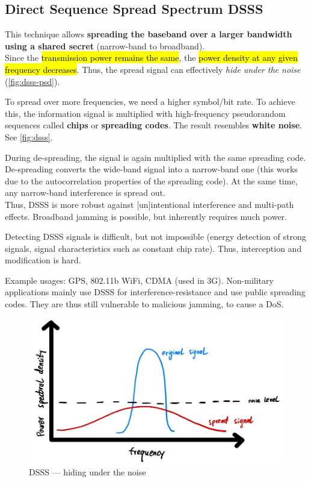 \subsection{Direct Sequence Spread Spectrum DSSS}
This technique allows  \textbf{spreading the baseband over a larger bandwidth using a shared secret} (narrow-band to broadband). \\
Since the \hl{transmission power remains the same}, the \hl{power density at any given frequency decreases}.
Thus, the spread signal can effectively \emph{hide under the noise} (\autoref{fig:dsss-psd}).

To spread over more frequencies, we need a higher symbol/bit rate. To achieve this, the information signal is multiplied with high-frequency pseudorandom sequences called \textbf{chips} or \textbf{spreading codes}.
The result resembles \textbf{white noise}.
See \autoref{fig:dsss}.

During de-spreading, the signal is again multiplied with the same spreading code.
De-spreading converts the wide-band signal into a narrow-band one (this works due to the autocorrelation properties of the spreading code).
At the same time, any narrow-band interference is spread out.
\\
Thus, DSSS is more robust against [un]intentional interference and multi-path effects. Broadband jamming is possible, but inherently requires much power.

Detecting DSSS signals is difficult, but not impossible (energy detection of strong signals, signal characteristics such as constant chip rate). Thus, interception and modification is hard.

Example usages: GPS, 802.11b WiFi, CDMA (used in 3G).
Non-military applications mainly use DSSS for interference-resistance and use public spreading codes.
They are thus still vulnerable to malicious jamming, to cause a DoS.

\begin{figure}[h]
	\centering
	\includegraphics[scale=0.4]{images/2-dsss-psd.jpg}
	\caption{DSSS --- hiding under the noise}%
	\label{fig:dsss-psd}
\end{figure}

